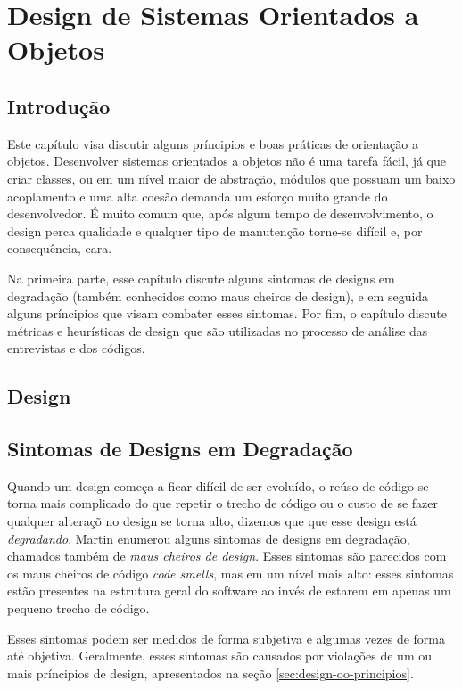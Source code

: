 \chapter{Design de Sistemas Orientados a Objetos}
\label{cap:design}

\section{Introdução}
\label{sec:design-introducao}

Este capítulo visa discutir alguns príncipios e boas práticas de orientação a objetos. Desenvolver sistemas orientados a objetos
não é uma tarefa fácil, já que criar classes, ou em um nível maior de abstração, módulos que possuam um baixo acoplamento
e uma alta coesão demanda um esforço muito grande do desenvolvedor. É muito comum que, após algum tempo de desenvolvimento,
o design perca qualidade e qualquer tipo de manutenção torne-se difícil e, por consequência, cara.

Na primeira parte, esse capítulo discute alguns sintomas de designs em degradação (também conhecidos como maus cheiros de design), 
e em seguida alguns príncipios que visam combater esses sintomas. Por fim, o capítulo discute métricas e heurísticas 
de design que são utilizadas no processo de análise das entrevistas e dos códigos.

\section{Design}


\section{Sintomas de Designs em Degradação}
\label{sec:design-degradacao}
Quando um design começa a ficar difícil de ser evoluído, o reúso de código se torna mais complicado do que repetir o trecho de código ou 
o custo de se fazer qualquer alteraçõ no design se torna alto, dizemos que que esse design está \textit{degradando}. 
Martin \cite{bob-martin} enumerou alguns sintomas de designs em degradação, chamados também de \textit{maus cheiros de design}. 
Esses sintomas são parecidos com os maus cheiros de código \textit{code smells}, mas em um nível mais alto: esses sintomas
estão presentes na estrutura geral do software ao invés de estarem em apenas um pequeno trecho de código.

Esses sintomas podem ser medidos de forma subjetiva e algumas vezes de forma até objetiva. Geralmente, esses sintomas são causados
por violações de um ou mais príncipios de design, apresentados na seção \ref{sec:design-oo-principios}. 


